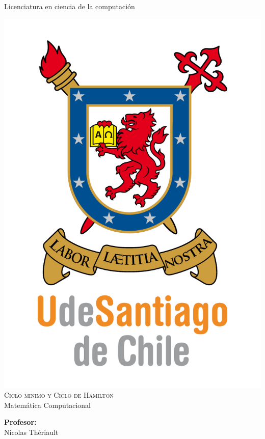 \documentclass[12pt,letterpaper]{scrartcl}
\author{Don cuyi}
\begin{document}
\begin{titlepage}

\begin{center}

{\Large { Licenciatura en ciencia de la computación} }

\includegraphics[scale=1]{UDSCNRJ}
\\[1cm]

{\Huge \textsc{Ciclo minimo y Ciclo de Hamilton}}\\[0.7cm]

{\huge  Matemática Computacional}\\[2cm]


\begin{minipage}[l]{0.4\textwidth}
	\begin{flushleft}
	\linespread{1}
		\textbf{\textsf{Profesor:}}\\
		\large Nicolas Thériault
	\end{flushleft}
\end{minipage}
\begin{minipage}[l]{0.4\textwidth}


\end{minipage}
\end{center}
\end{titlepage}
\end{document}

